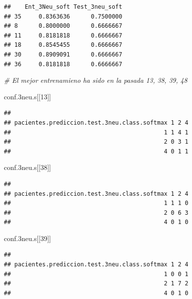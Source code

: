 \documentclass[]{article}
\newenvironment{Shaded}{\begin{snugshade}}{\end{snugshade}}
\newcommand{\CommentTok}[1]{\textcolor[rgb]{0.56,0.35,0.01}{\textit{#1}}}
\newcommand{\DecValTok}[1]{\textcolor[rgb]{0.00,0.00,0.81}{#1}}
\newcommand{\FloatTok}[1]{\textcolor[rgb]{0.00,0.00,0.81}{#1}}
\newcommand{\NormalTok}[1]{#1}
\begin{document}
\begin{verbatim}
##    Ent_3Neu_soft Test_3neu_soft
## 35     0.8363636      0.7500000
## 8      0.8000000      0.6666667
## 11     0.8181818      0.6666667
## 18     0.8545455      0.6666667
## 30     0.8909091      0.6666667
## 36     0.8181818      0.6666667
\end{verbatim}

\begin{Shaded}
\begin{Highlighting}[]
\CommentTok{# El mejor entrenamieno ha sido en la pasada 13, 38, 39, 48}

\NormalTok{conf}\FloatTok{.3}\NormalTok{neu.s[[}\DecValTok{13}\NormalTok{]]}
\end{Highlighting}
\end{Shaded}

\begin{verbatim}
##                                             
## pacientes.prediccion.test.3neu.class.softmax 1 2 4
##                                            1 1 4 1
##                                            2 0 3 1
##                                            4 0 1 1
\end{verbatim}

\begin{Shaded}
\begin{Highlighting}[]
\NormalTok{conf}\FloatTok{.3}\NormalTok{neu.s[[}\DecValTok{38}\NormalTok{]]}
\end{Highlighting}
\end{Shaded}

\begin{verbatim}
##                                             
## pacientes.prediccion.test.3neu.class.softmax 1 2 4
##                                            1 1 1 0
##                                            2 0 6 3
##                                            4 0 1 0
\end{verbatim}

\begin{Shaded}
\begin{Highlighting}[]
\NormalTok{conf}\FloatTok{.3}\NormalTok{neu.s[[}\DecValTok{39}\NormalTok{]]}
\end{Highlighting}
\end{Shaded}

\begin{verbatim}
##                                             
## pacientes.prediccion.test.3neu.class.softmax 1 2 4
##                                            1 0 0 1
##                                            2 1 7 2
##                                            4 0 1 0
\end{verbatim}
\end{document}

